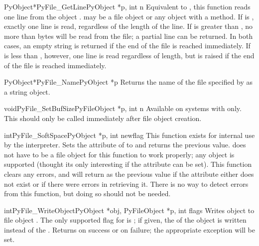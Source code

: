 \begin{cfuncdesc}{PyObject*}{PyFile_GetLine}{PyObject *p, int n}
  Equivalent to , this
  function reads one line from the object .   may be a
  file object or any object with a  method.  If
   is , exactly one line is read, regardless of the
  length of the line.  If  is greater than , no more
  than  bytes will be read from the file; a partial line can be
  returned.  In both cases, an empty string is returned if the end of
  the file is reached immediately.  If  is less than ,
  however, one line is read regardless of length, but
   is raised if the end of the file is reached
  immediately.
\end{cfuncdesc}

\begin{cfuncdesc}{PyObject*}{PyFile_Name}{PyObject *p}
  Returns the name of the file specified by  as a string
  object.
\end{cfuncdesc}

\begin{cfuncdesc}{void}{PyFile_SetBufSize}{PyFileObject *p, int n}
  Available on systems with 
  only.  This should only be called immediately after file object
  creation.
\end{cfuncdesc}

\begin{cfuncdesc}{int}{PyFile_SoftSpace}{PyObject *p, int newflag}
  This function exists for internal use by the interpreter.  Sets the
   attribute of  to  and
  returns the
  previous value.   does not have to be a file object for this
  function to work properly; any object is supported (thought its only
  interesting if the  attribute can be set).  This
  function clears any errors, and will return  as the previous
  value if the attribute either does not exist or if there were errors
  in retrieving it.  There is no way to detect errors from this
  function, but doing so should not be needed.
\end{cfuncdesc}

\begin{cfuncdesc}{int}{PyFile_WriteObject}{PyObject *obj, PyFileObject *p,
                                           int flags}
  Writes object  to file object .  The only supported
  flag for  is
  ; if given, the
   of the object is written instead of the
  .  Returns  on success or  on
  failure; the appropriate exception will be set.
\end{cfuncdesc}

